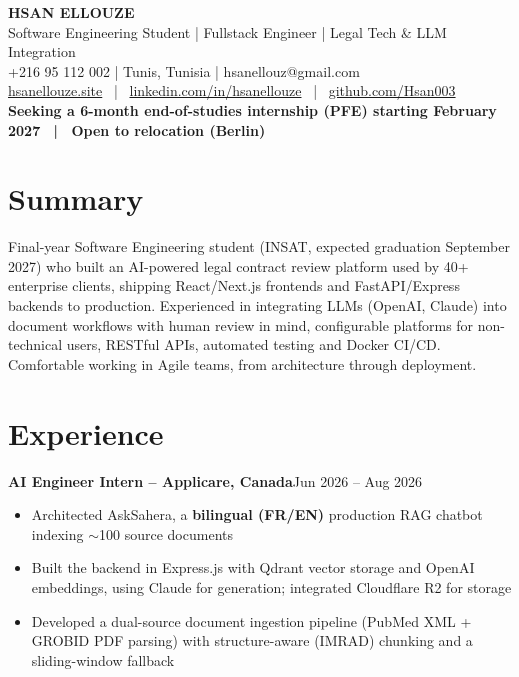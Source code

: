 \documentclass[10pt,a4paper]{article}
\newcommand{\entry}[2]{\vspace{1pt}\noindent\textbf{#1}\hfill{\color{muted}#2}\par}
\begin{document}
\begin{center}
  {\LARGE\bfseries HSAN ELLOUZE}\\[2pt]
  {\color{muted} Software Engineering Student | Fullstack Engineer | Legal Tech \& LLM Integration}\\[2pt]
  {\footnotesize +216 95 112 002 | Tunis, Tunisia | hsanellouz@gmail.com}\\[1pt]
  {\footnotesize \href{https://hsanellouze.site}{hsanellouze.site} \ | \ \href{https://linkedin.com/in/hsanellouze}{linkedin.com/in/hsanellouze} \ | \ \href{https://github.com/Hsan003}{github.com/Hsan003}}\\[3pt]
  {\footnotesize\bfseries Seeking a 6-month end-of-studies internship (PFE) starting February 2027 \ | \ Open to relocation (Berlin)}
\end{center}

\section{Summary}
Final-year Software Engineering student (INSAT, expected graduation September 2027) who built an AI-powered legal contract review platform used by 40+ enterprise clients, shipping React/Next.js frontends and FastAPI/Express backends to production. Experienced in integrating LLMs (OpenAI, Claude) into document workflows with human review in mind, configurable platforms for non-technical users, RESTful APIs, automated testing and Docker CI/CD. Comfortable working in Agile teams, from architecture through deployment.

\section{Experience}
\entry{AI Engineer Intern -- Applicare, Canada}{Jun 2026 -- Aug 2026}
\begin{itemize}
  \item Architected AskSahera, a \textbf{bilingual (FR/EN)} production RAG chatbot indexing $\sim$100 source documents
  \item Built the backend in Express.js with Qdrant vector storage and OpenAI embeddings, using Claude for generation; integrated Cloudflare R2 for storage
  \item Developed a dual-source document ingestion pipeline (PubMed XML + GROBID PDF parsing) with structure-aware (IMRAD) chunking and a sliding-window fallback
\end{itemize}
\end{document}
